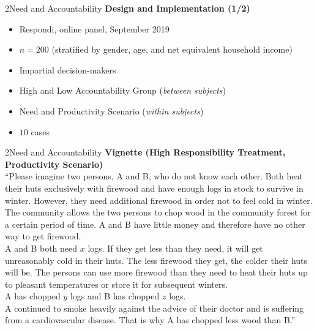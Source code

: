 \documentclass[xcolor=table,9pt,aspectratio=169]{beamer}
\begin{document}
\begin{frame}{\vspace*{10mm}2\hspace*{1em}Need and Accountability}
\textbf{Design and Implementation (1/2)}\\
\medskip
\begin{itemize}
   \item Respondi, online panel, September 2019
   \item $n=200$ (stratified by gender, age, and net equivalent household income)
   \item Impartial decision-makers
   \item High and Low Accountability Group (\textit{between subjects})
   \item Need and Productivity Scenario (\textit{within subjects})
   \item $10$ cases
\end{itemize}
\end{frame}


\begin{frame}{\vspace*{10mm}2\hspace*{1em}Need and Accountability}
\textbf{Vignette (High Responsibility Treatment, Productivity Scenario)}\\
\medskip
\enquote{Please imagine two persons, A and B, who do not know each other.
Both heat their huts exclusively with firewood and have enough logs in stock to survive in winter.
However, they need additional firewood in order not to feel cold in winter.
The community allows the two persons to chop wood in the community forest for a certain period of time.
A and B have little money and therefore have no other way to get firewood.\\
\medskip
A and B both need $x$ logs.
If they get less than they need, it will get unreasonably cold in their huts.
The less firewood they get, the colder their huts will be.
The persons can use more firewood than they need to heat their huts up to pleasant temperatures or store it for subsequent winters.\\
\medskip
A has chopped $y$ logs and B has chopped $z$ logs.\\
\medskip
A continued to smoke heavily against the advice of their doctor and is suffering from a cardiovascular disease.
That is why A has chopped less wood than B.}
\end{frame}
\end{document}
